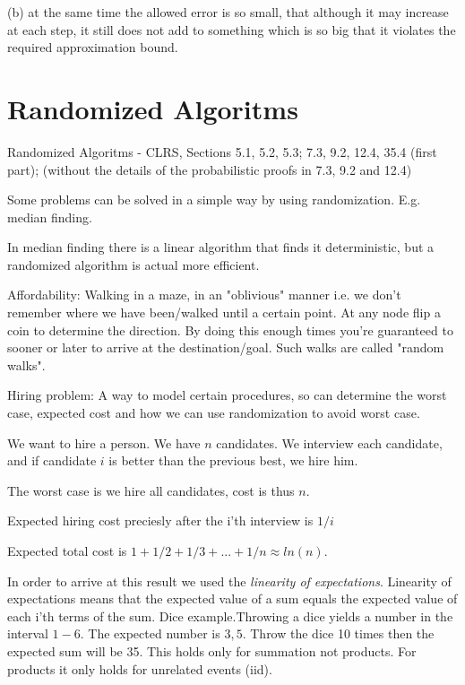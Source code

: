 \documentclass[10pt]{article}
\begin{document}
(b) at the same time the allowed error is so small, that although it may increase at each step, it still does not add to something which is so big that it violates the required approximation bound.


\section{Randomized Algoritms} %
\label{sec:randomized_algoritms}
Randomized Algoritms - CLRS, Sections  5.1, 5.2, 5.3; 7.3, 9.2, 12.4, 35.4 (first part); (without the details of the probabilistic proofs in 7.3, 9.2 and 12.4)                                                                                                                                                    

Some problems can be solved in a simple way by using randomization. E.g. median finding. 

In median finding there is a linear algorithm that finds it deterministic, but a randomized algorithm is actual more efficient.

Affordability: Walking in a maze, in an "oblivious" manner i.e. we don't remember where we have been/walked until a certain point. At any node flip a coin to determine the direction. By doing this enough times you're guaranteed to sooner or later to arrive at the destination/goal. Such walks are called "random walks". 


Hiring problem: A way to model certain procedures, so can determine the worst case, expected cost and how we can use randomization to avoid worst case.


We want to hire a person. We have $n$ candidates. We interview each candidate, and if candidate $i$ is better than the previous best, we hire him.

The worst case is we hire all candidates, cost is thus $n$.

Expected hiring cost preciesly after the i'th interview is $1/i$

Expected total cost is $1+1/2+1/3+...+1/n \approx ln(n)$.

In order to arrive at this result we used the \emph{linearity of expectations}. Linearity of expectations means that the expected value of a sum equals the expected value of each i'th terms of the sum. Dice example.Throwing a dice yields a number in the interval $1-6$. The expected number is $3,5$. Throw the dice 10 times then the expected sum will be 35. This holds only for summation not products. For products it only holds for unrelated events (iid).
\end{document}
